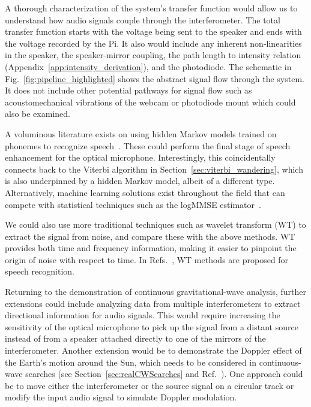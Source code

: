 \documentclass[paper-main.tex]{subfiles}
\begin{document}
A thorough characterization of the system's transfer function would allow us to understand how audio signals couple through the interferometer. 
The total transfer function starts with the voltage being sent to the speaker and ends with the voltage recorded by the Pi. It also would include any inherent non-linearities in the speaker, the speaker-mirror coupling, the path length to intensity relation (Appendix~\ref{app:intensity_derivation}), and the photodiode. The schematic in Fig.~\ref{fig:pipeline_highlighted} shows the abstract signal flow through the system.
It does not include other potential pathways for signal flow such as acoustomechanical vibrations of the webcam or photodiode mount which could also be examined.

A voluminous literature exists on using hidden Markov models trained on phonemes to recognize speech~\cite{HMM_english}. These could perform the final stage of speech enhancement for the optical microphone. Interestingly, this coincidentally connects back to the Viterbi algorithm in Section~\ref{sec:viterbi_wandering}, which is also underpinned by a hidden Markov model, albeit of a different type. Alternatively, machine learning solutions exist throughout the field that can compete with statistical techniques such as the logMMSE estimator~\cite{SEGAN}.


We could also use more traditional techniques such as wavelet transform (WT) \citep{nason1995stationary} to extract the signal from noise, and compare these with the above methods. WT provides both time and frequency information, making it easier to pinpoint the origin of noise with respect to time. In Refs.~\cite{tufekci2000feature,agbinya1996discrete}, WT methods are proposed for speech recognition. 

Returning to the demonstration of continuous gravitational-wave analysis, further extensions could include analyzing data from multiple interferometers to extract directional information for audio signals. 
This would require increasing the sensitivity of the optical microphone to pick up the signal from a distant source instead of from a speaker attached directly to one of the mirrors of the interferometer.
Another extension would be to demonstrate the Doppler effect of the Earth's motion around the Sun, which needs to be considered in continuous-wave searches (see Section~\ref{sec:realCWSearches} and Ref.~\cite{JKS:1998}). 
One approach could be to move either the interferometer or the source signal on a circular track or modify the input audio signal to simulate Doppler modulation. 
\end{document}
